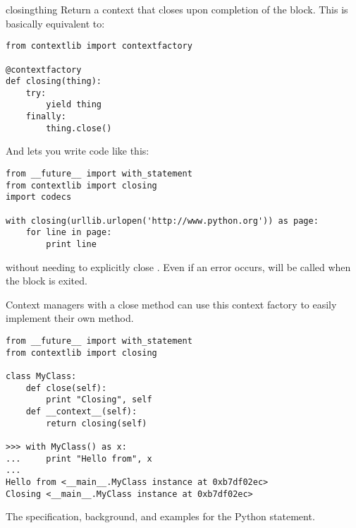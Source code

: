 \label{context-closing}
\begin{funcdesc}{closing}{thing}
Return a context that closes  upon completion of the
block.  This is basically equivalent to:

\begin{verbatim}
from contextlib import contextfactory

@contextfactory
def closing(thing):
    try:
        yield thing
    finally:
        thing.close()
\end{verbatim}

And lets you write code like this:
\begin{verbatim}
from __future__ import with_statement
from contextlib import closing
import codecs

with closing(urllib.urlopen('http://www.python.org')) as page:
    for line in page:
        print line
\end{verbatim}

without needing to explicitly close .  Even if an error
occurs,  will be called when the 
block is exited.

Context managers with a close method can use this context factory
to easily implement their own  method.
\begin{verbatim}
from __future__ import with_statement
from contextlib import closing

class MyClass:
    def close(self):
        print "Closing", self
    def __context__(self):
        return closing(self)

>>> with MyClass() as x:
...     print "Hello from", x
...
Hello from <__main__.MyClass instance at 0xb7df02ec>
Closing <__main__.MyClass instance at 0xb7df02ec>
\end{verbatim}
\end{funcdesc}

\begin{seealso}
         {The specification, background, and examples for the
          Python  statement.}
\end{seealso}
